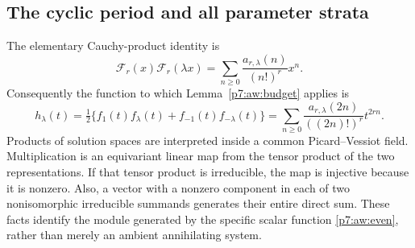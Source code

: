 \documentclass[11pt,a4paper]{article}
\theoremstyle{definition}
\theoremstyle{remark}
\numberwithin{equation}{section}
\begin{document}
\subsection{The cyclic period and all parameter strata}

The elementary Cauchy-product identity is
\begin{equation}\label{p7:aw:cauchy}
 \mathcal F_r(x)\mathcal F_r(\lambda x)
   =\sum_{n\ge0}\frac{a_{r,\lambda}(n)}{(n!)^r}x^n.
\end{equation}
Consequently the function to which Lemma~\ref{p7:aw:budget} applies is
\begin{equation}\label{p7:aw:even}
 h_\lambda(t)=\tfrac12\{f_1(t)f_\lambda(t)
                            +f_{-1}(t)f_{-\lambda}(t)\}
 =\sum_{n\ge0}\frac{a_{r,\lambda}(2n)}{((2n)!)^r}t^{2rn}.
\end{equation}
Products of solution spaces are interpreted inside a common
Picard--Vessiot field. Multiplication is an equivariant linear map
from the tensor product of the two representations. If that tensor
product is irreducible, the map is injective because it is nonzero.
Also, a vector with a nonzero component in each of two nonisomorphic
irreducible summands generates their entire direct sum. These facts
identify the module generated by the specific scalar function
\eqref{p7:aw:even}, rather than merely an ambient annihilating system.
\end{document}
